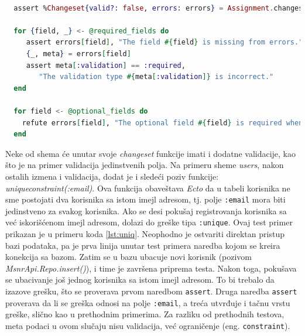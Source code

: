 \documentclass[12pt,oneside]{memoir}
\begin{document}
\begin{minipage}{\linewidth}
\begin{lstlisting}[language=elixir, basicstyle=\small, caption={Test primer neuspešne upotrebe funkcije \emph{changeset/2}, sa nedostajućim parametrima},captionpos=b, label={lst:req}]
  
  assert %Changeset{valid?: false, errors: errors} = Assignment.changeset(%Assignment{}, %{})

  for {field, _} <- @required_fields do
     assert errors[field], "The field #{field} is missing from errors."
     {_, meta} = errors[field]
     assert meta[:validation] == :required,
        "The validation type #{meta[:validation]} is incorrect."
  end

  for field <- @optional_fields do
    refute errors[field], "The optional field #{field} is required when it shouldn't be."
  end
\end{lstlisting}
\end{minipage}

\par Neke od shema će unutar svoje \emph{changeset} funkcije imati i dodatne validacije, kao što je na primer validacija jedinstvenih polja. Na primeru sheme \emph{users}, nakon ostalih izmena i validacija, dodat je i sledeći poziv funkcije: \emph{unique{\textunderscore}constraint(:email)}. Ova funkcija obaveštava \emph{Ecto} da u tabeli korisnika ne sme postojati dva korisnika sa istom imejl adresom, tj. polje \texttt{:email} mora biti jedinstveno za svakog korisnika. Ako se desi pokušaj registrovanja korisnika sa već iskorišćenom imejl adresom, dolazi do greške tipa \texttt{:unique}. Ovaj test primer prikazan je u primeru koda \ref{lst:uniq}. Neophodno je ostvariti direktan pristup bazi podataka, pa je prva linija unutar test primera naredba kojom se kreira konekcija sa bazom. Zatim se u bazu ubacuje novi korisnik (pozivom \emph{MsnrApi.Repo.insert()}), i time je završena priprema testa. Nakon toga, pokušava se ubacivanje još jednog korisnika sa istom imejl adresom. To bi trebalo da izazove grešku, što se proverava prvom naredbom \texttt{assert}. Druga naredba \texttt{assert} proverava da li se greška odnosi na polje \texttt{:email}, a treća utvrđuje i tačnu vrstu greške, slično kao u prethodnim primerima. Za razliku od prethodnih testova, meta podaci u ovom slučaju nisu validacija, već ograničenje (eng. \texttt{constraint}). \\
\end{document}
